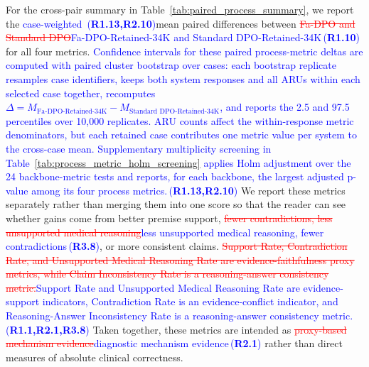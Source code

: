 \documentclass[a4paper,fleqn,doubleblind]{cas-sc}
\DeclareRobustCommand{\deleted}[1]{\textcolor{red}{\sout{#1}}}
\DeclareRobustCommand{\added}[1]{\textcolor{blue}{#1}}
\DeclareRobustCommand{\revtag}[1]{\textcolor{blue}{\scriptsize\,(\textbf{#1})}}
\begin{document}
For the cross-pair summary in Table~\ref{tab:paired_process_summary}, we report the \added{case-weighted }\revtag{R1.13,R2.10}mean paired differences between \deleted{Fa-DPO and Standard DPO}\added{Fa-DPO-Retained-34K and Standard DPO-Retained-34K}\revtag{R1.10} for all four metrics. \added{Confidence intervals for these paired process-metric deltas are computed with paired cluster bootstrap over cases: each bootstrap replicate resamples case identifiers, keeps both system responses and all ARUs within each selected case together, recomputes $\Delta = M_{\text{Fa-DPO-Retained-34K}} - M_{\text{Standard DPO-Retained-34K}}$, and reports the 2.5 and 97.5 percentiles over 10,000 replicates. ARU counts affect the within-response metric denominators, but each retained case contributes one metric value per system to the cross-case mean. Supplementary multiplicity screening in Table~\ref{tab:process_metric_holm_screening} applies Holm adjustment over the 24 backbone-metric tests and reports, for each backbone, the largest adjusted p-value among its four process metrics.}\revtag{R1.13,R2.10} We report these metrics separately rather than merging them into one score so that the reader can see whether gains come from better premise support, \deleted{fewer contradictions, less unsupported medical reasoning}\added{less unsupported medical reasoning, fewer contradictions}\revtag{R3.8}, or more consistent claims. \deleted{Support Rate, Contradiction Rate, and Unsupported Medical Reasoning Rate are evidence-faithfulness proxy metrics, while Claim Inconsistency Rate is a reasoning-answer consistency metric.}\added{Support Rate and Unsupported Medical Reasoning Rate are evidence-support indicators, Contradiction Rate is an evidence-conflict indicator, and Reasoning-Answer Inconsistency Rate is a reasoning-answer consistency metric.}\revtag{R1.1,R2.1,R3.8} Taken together, these metrics are intended as \deleted{proxy-based mechanism evidence}\added{diagnostic mechanism evidence}\revtag{R2.1} rather than direct measures of absolute clinical correctness.
\end{document}
